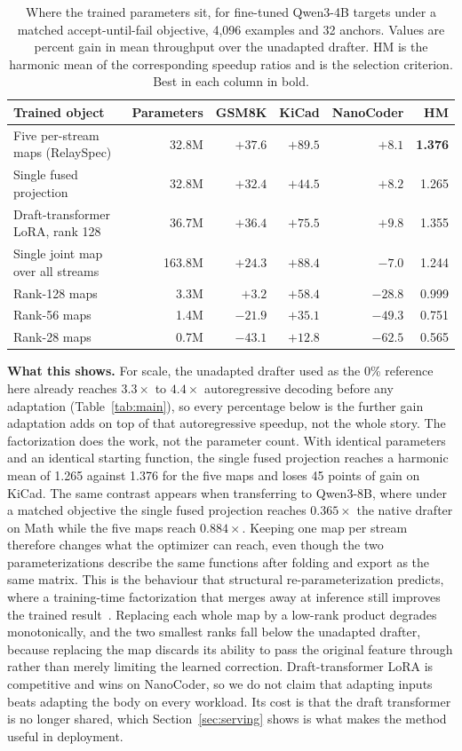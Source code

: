 \begin{table}[t]
\centering
\caption{Where the trained parameters sit, for fine-tuned Qwen3-4B targets under a matched accept-until-fail objective, 4{,}096 examples and 32 anchors. Values are percent gain in mean throughput over the unadapted drafter. HM is the harmonic mean of the corresponding speedup ratios and is the selection criterion. Best in each column in bold.}
\label{tab:ablation-placement}
\small
\begin{tabular}{lrrrrr}
\toprule
Trained object & Parameters & GSM8K & KiCad & NanoCoder & HM \\
\midrule
Five per-stream maps (RelaySpec) & 32.8M & $\mathbf{+37.6}$ & $+89.5$ & $+8.1$ & \textbf{1.376} \\
Single fused projection & 32.8M & $+32.4$ & $+44.5$ & $+8.2$ & 1.265 \\
Draft-transformer LoRA, rank 128 & 36.7M & $+36.4$ & $+75.5$ & $\mathbf{+9.8}$ & 1.355 \\
Single joint map over all streams & 163.8M & $+24.3$ & $\mathbf{+88.4}$ & $-7.0$ & 1.244 \\
Rank-128 maps & 3.3M & $+3.2$ & $+58.4$ & $-28.8$ & 0.999 \\
Rank-56 maps & 1.4M & $-21.9$ & $+35.1$ & $-49.3$ & 0.751 \\
Rank-28 maps & 0.7M & $-43.1$ & $+12.8$ & $-62.5$ & 0.565 \\
\bottomrule
\end{tabular}
\end{table}

\textbf{What this shows.} For scale, the unadapted drafter used as the 0\% reference here already reaches $3.3\times$ to $4.4\times$ autoregressive decoding before any adaptation (Table~\ref{tab:main}), so every percentage below is the further gain adaptation adds on top of that autoregressive speedup, not the whole story. The factorization does the work, not the parameter count. With identical parameters and an identical starting function, the single fused projection reaches a harmonic mean of 1.265 against 1.376 for the five maps and loses 45 points of gain on KiCad. The same contrast appears when transferring to Qwen3-8B, where under a matched objective the single fused projection reaches $0.365\times$ the native drafter on Math while the five maps reach $0.884\times$. Keeping one map per stream therefore changes what the optimizer can reach, even though the two parameterizations describe the same functions after folding and export as the same matrix. This is the behaviour that structural re-parameterization predicts, where a training-time factorization that merges away at inference still improves the trained result~\citep{huo2026repspec}. Replacing each whole map by a low-rank product degrades monotonically, and the two smallest ranks fall below the unadapted drafter, because replacing the map discards its ability to pass the original feature through rather than merely limiting the learned correction. Draft-transformer LoRA is competitive and wins on NanoCoder, so we do not claim that adapting inputs beats adapting the body on every workload. Its cost is that the draft transformer is no longer shared, which Section~\ref{sec:serving} shows is what makes the method useful in deployment.

